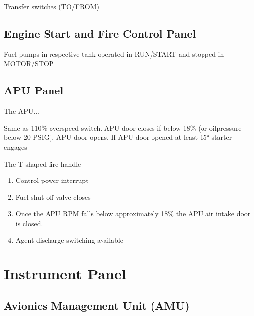 Transfer switches (TO/FROM)

\subsection{Engine Start and Fire Control Panel}
\label{sec:eng-panel}

\begin{enumerate}
    \begin{itemize}
    \end{itemize}
    Fuel pumps in respective tank operated in RUN/START and stopped in MOTOR/STOP
\end{enumerate}

\subsection{APU Panel}
\label{sec:apu-panel}

The \gls{APU}...

\begin{enumerate}
    \begin{itemize}
       Same as 110\% overspeed switch. APU door closes if below 18\% (or oilpressure below 20 PSIG).
       APU door opens.
       If APU door opened at least 15° starter engages
    \end{itemize}
   The T-shaped fire handle
    \begin{enumerate}
      \item Control power interrupt
      \item Fuel shut-off valve closes
      \item Once the APU \gls{RPM} falls below approximately 18\% the APU air intake door is closed.
      \item Agent discharge switching available
    \end{enumerate}
\end{enumerate}

\section{Instrument Panel}

\subsection{Avionics Management Unit (AMU)}
\label{sec:amu}

